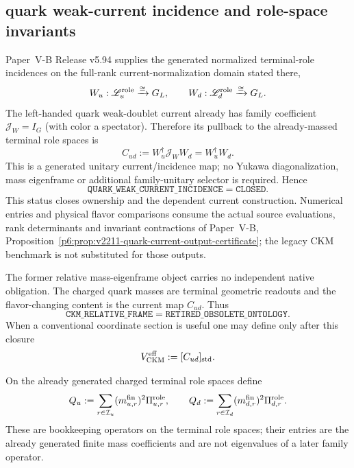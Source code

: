 \documentclass[12pt,a4paper]{article}
\begin{document}
\subsection{quark weak-current incidence and role-space invariants}
\label{p5:sec:v3101-quark-current-incidence-closure}

\begin{theorem}
\label{p5:thm:v3101-generated-quark-current-incidence}
Paper~V-B Release v5.94 supplies the generated normalized terminal-role
incidences on the full-rank current-normalization domain stated there,
\[
 W_u:\mathscr L_u^{\rm role}\xrightarrow{\cong}G_L,
 \qquad
 W_d:\mathscr L_d^{\rm role}\xrightarrow{\cong}G_L.
\]
The left-handed quark weak-doublet current already has family coefficient
\(\mathscr J_W=I_G\) (with color a spectator).  Therefore its pullback to the
already-massed terminal role spaces is
\[
 \boxed{C_{ud}:=W_u^\dagger\mathscr J_WW_d=W_u^\dagger W_d.}
\]
This is a generated unitary current/incidence map; no Yukawa diagonalization,
mass eigenframe or additional family-unitary selector is required.  Hence
\[
 \boxed{
 \texttt{QUARK\_WEAK\_CURRENT\_INCIDENCE}=\texttt{CLOSED}.}
\]
This status closes ownership and the dependent current construction.
Numerical entries and physical flavor comparisons consume the actual
source evaluations, rank determinants and invariant contractions of
Paper~V-B, Proposition~\ref{p6:prop:v2211-quark-current-output-certificate};
the legacy CKM benchmark is not substituted for those outputs.
\end{theorem}

\begin{corollary}
\label{p5:cor:v3101-former-ckm-target-exhausted}
The former relative mass-eigenframe object carries no independent native
obligation.  The charged quark masses are terminal geometric readouts and the
flavor-changing content is the current map $C_{ud}$.  Thus
\[
 \boxed{
 \texttt{CKM\_RELATIVE\_FRAME}=\texttt{RETIRED\_OBSOLETE\_ONTOLOGY}.}
\]
When a conventional coordinate section is useful one may define only after
this closure
\[
 V_{\rm CKM}^{\rm eff}:=[C_{ud}]_{\rm std}.
\]
\end{corollary}

\begin{definition}
\label{p5:def:v3101-native-role-weight-operators}
On the already generated charged terminal role spaces define
\[
 Q_u:=\sum_{r\in\mathcal I_u}(m_{u,r}^{\rm fin})^2\Pi_{u,r}^{\rm role},
 \qquad
 Q_d:=\sum_{r\in\mathcal I_d}(m_{d,r}^{\rm fin})^2\Pi_{d,r}^{\rm role}.
\]
These are bookkeeping operators on the terminal role spaces; their entries are
the already generated finite mass coefficients and are not eigenvalues of a
later family operator.
\end{definition}
\end{document}
